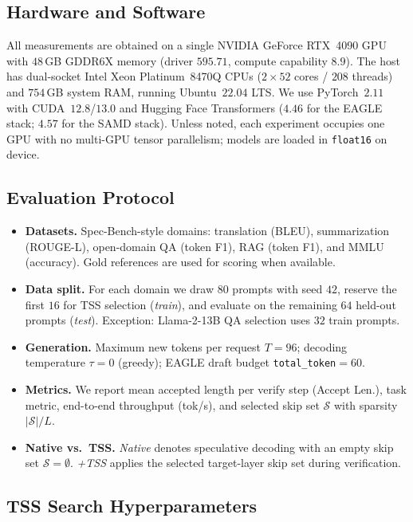 \subsection{Hardware and Software}
\label{sec:setup-hardware}

All measurements are obtained on a single NVIDIA GeForce RTX~4090 GPU with $48$\,GB GDDR6X memory (driver $595.71$, compute capability $8.9$).
The host has dual-socket Intel Xeon Platinum~8470Q CPUs ($2{\times}52$ cores / $208$ threads) and $754$\,GB system RAM, running Ubuntu~$22.04$ LTS.
We use PyTorch~$2.11$ with CUDA~$12.8$/$13.0$ and Hugging Face Transformers ($4.46$ for the EAGLE stack; $4.57$ for the SAMD stack).
Unless noted, each experiment occupies one GPU with no multi-GPU tensor parallelism; models are loaded in \texttt{float16} on device.

\subsection{Evaluation Protocol}
\label{sec:setup-eval}

\begin{itemize}
  \item \textbf{Datasets.} Spec-Bench-style domains: translation (BLEU), summarization (ROUGE-L), open-domain QA (token F1), RAG (token F1), and MMLU (accuracy). Gold references are used for scoring when available.
  \item \textbf{Data split.} For each domain we draw $80$ prompts with seed $42$, reserve the first $16$ for TSS selection (\emph{train}), and evaluate on the remaining $64$ held-out prompts (\emph{test}). Exception: Llama-2-13B QA selection uses $32$ train prompts.
  \item \textbf{Generation.} Maximum new tokens per request $T{=}96$; decoding temperature $\tau{=}0$ (greedy); EAGLE draft budget \texttt{total\_token}${=}60$.
  \item \textbf{Metrics.} We report mean accepted length per verify step (Accept Len.), task metric, end-to-end throughput (tok/s), and selected skip set $\mathcal{S}$ with sparsity $|\mathcal{S}|/L$.
  \item \textbf{Native vs.\ TSS.} \emph{Native} denotes speculative decoding with an empty skip set $\mathcal{S}{=}\emptyset$. \emph{+TSS} applies the selected target-layer skip set during verification.
\end{itemize}

\subsection{TSS Search Hyperparameters}
\label{sec:setup-hparams}

